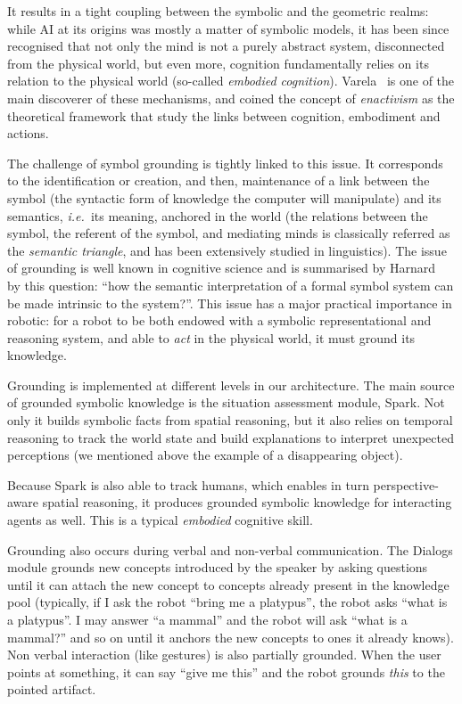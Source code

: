 \documentclass[preprint,5p]{elsarticle}
\newcommand{\ie}{{\textit{i.e.\ }}}
\begin{document}
It results in a tight coupling between the symbolic and the geometric realms:
while AI at its origins was mostly a matter of symbolic models, it has been
since recognised that not only the mind is not a purely abstract system,
disconnected from the physical world, but even more, cognition fundamentally
relies on its relation to the physical world (so-called \emph{embodied
cognition}). Varela~\cite{Varela1992} is one of the main discoverer of these
mechanisms, and coined the concept of \emph{enactivism} as the theoretical
framework that study the links between cognition, embodiment and actions.

The challenge of symbol grounding is tightly linked to this issue. It
corresponds to the identification or creation, and then, maintenance of a link
between the symbol (the syntactic form of knowledge the computer will
manipulate) and its semantics, \ie its meaning, anchored in the world (the
relations between the symbol, the referent of the symbol, and mediating minds
is classically referred as the \emph{semantic triangle}, and has been
extensively studied in linguistics). The issue of grounding is well known in
cognitive science and is summarised by Harnard~\cite{Harnad1990} by this
question: ``how the semantic interpretation of a formal symbol system can be
made intrinsic to the system?''. This issue has a major practical importance in
robotic: for a robot to be both endowed with a symbolic representational and
reasoning system, and able to \emph{act} in the physical world, it must ground
its knowledge.

Grounding is implemented at different levels in our architecture. The main source
of grounded symbolic knowledge is the situation assessment module, {\sc Spark}.
Not only it builds symbolic facts from spatial reasoning, but it also relies on
temporal reasoning to track the world state and build explanations to interpret
unexpected perceptions (we mentioned above the example of a disappearing
object).

Because {\sc Spark} is also able to track humans, which enables in turn
perspective-aware spatial reasoning, it produces grounded symbolic knowledge
for interacting agents as well. This is a typical \emph{embodied} cognitive
skill.

Grounding also occurs during verbal and non-verbal communication. The {\sc
Dialogs} module grounds new concepts introduced by the speaker by asking questions
until it can attach the new concept to concepts already present in the
knowledge pool (typically, if I ask the robot ``bring me a platypus'', the
robot asks ``what is a platypus''. I may answer ``a mammal'' and the robot will
ask ``what is a mammal?'' and so on until it anchors the new concepts to ones
it already knows). Non verbal interaction (like gestures) is also partially
grounded. When the user points at something, it can say ``give me this'' and
the robot grounds \emph{this} to the pointed artifact.
\end{document}
